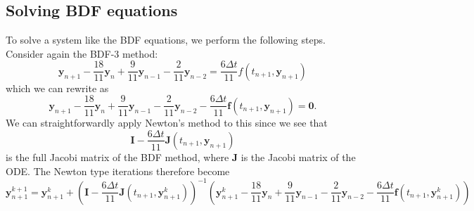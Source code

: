 \documentclass[10pt,a4paper]{article}
\newcommand{\bvec}[1]{\mathbf{#1}}
\begin{document}
\subsection{Solving BDF equations}
To solve a system like the BDF equations, we perform the following steps. Consider again the BDF-3 method:
\begin{equation*}
  \bvec{y}_{n+1} - \frac{18}{11}\bvec{y}_n + \frac{9}{11}\bvec{y}_{n-1} - \frac{2}{11}\bvec{y}_{n-2} = \frac{6 \Delta t}{11}f(t_{n+1}, \bvec{y}_{n+1})
\end{equation*}
which we can rewrite as
\begin{equation*}
  \bvec{y}_{n+1} - \frac{18}{11}\bvec{y}_n + \frac{9}{11}\bvec{y}_{n-1} - \frac{2}{11}\bvec{y}_{n-2} - \frac{6 \Delta t}{11}\bvec{f}(t_{n+1}, \bvec{y}_{n+1}) = \bvec{0}.
\end{equation*}
We can straightforwardly apply Newton's method to this since we see that
\begin{equation*}
  \bvec{I}  - \frac{6 \Delta t}{11}\bvec{J}(t_{n+1}, \bvec{y}_{n+1})
\end{equation*}
is the full Jacobi matrix of the BDF method, where $\bvec{J}$ is the Jacobi matrix of the ODE. The Newton type iterations therefore become
\begin{equation*}
  \bvec{y}_{n+1}^{k+1} = \bvec{y}_{n+1}^k + \left(\bvec{I}  - \frac{6 \Delta t}{11}\bvec{J}(t_{n+1}, \bvec{y}^{k}_{n+1})\right)^{-1}\left( \bvec{y}^{k}_{n+1} - \frac{18}{11}\bvec{y}_n + \frac{9}{11}\bvec{y}_{n-1} - \frac{2}{11}\bvec{y}_{n-2} - \frac{6 \Delta t}{11}\bvec{f}(t_{n+1}, \bvec{y}_{n+1}^{k}) \right)
\end{equation*}
\end{document}
